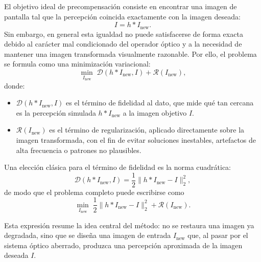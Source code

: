\documentclass[conference]{IEEEtran}
\begin{document}
El objetivo ideal de precompensación consiste en encontrar una imagen de pantalla tal que la percepción coincida exactamente con la imagen deseada:
\begin{equation}
I = h * I_{\text{new}}.
\label{eq:ideal}
\end{equation}
Sin embargo, en general esta igualdad no puede satisfacerse de forma exacta debido al carácter mal condicionado del operador óptico y a la necesidad de mantener una imagen transformada visualmente razonable. Por ello, el problema se formula como una minimización variacional:
\begin{equation}
\min_{I_{\text{new}}}
\;
\mathcal{D}(h * I_{\text{new}}, I)
+
\mathcal{R}(I_{\text{new}}),
\label{eq:variational}
\end{equation}
donde:
\begin{itemize}
    \item $\mathcal{D}(h * I_{\text{new}}, I)$ es el término de fidelidad al dato, que mide qué tan cercana es la percepción simulada $h * I_{\text{new}}$ a la imagen objetivo $I$.
    \item $\mathcal{R}(I_{\text{new}})$ es el término de regularización, aplicado directamente sobre la imagen transformada, con el fin de evitar soluciones inestables, artefactos de alta frecuencia o patrones no plausibles.
\end{itemize}

Una elección clásica para el término de fidelidad es la norma cuadrática:
\begin{equation}
\mathcal{D}(h * I_{\text{new}}, I)
=
\frac{1}{2}\|h * I_{\text{new}} - I\|_2^2,
\label{eq:l2data}
\end{equation}
de modo que el problema completo puede escribirse como
\begin{equation}
\min_{I_{\text{new}}}
\;
\frac{1}{2}\|h * I_{\text{new}} - I\|_2^2
+
\mathcal{R}(I_{\text{new}}).
\label{eq:full_problem}
\end{equation}

Esta expresión resume la idea central del método: no se restaura una imagen ya degradada, sino que se diseña una imagen de entrada $I_{\text{new}}$ que, al pasar por el sistema óptico aberrado, produzca una percepción aproximada de la imagen deseada $I$.
\end{document}
